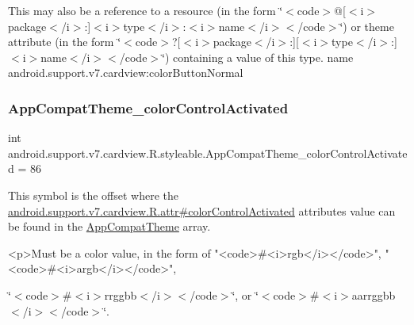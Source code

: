 This may also be a reference to a resource (in the form \char`\"{}$<$code$>$@\mbox{[}$<$i$>$package$<$/i$>$\+:\mbox{]}$<$i$>$type$<$/i$>$\+:$<$i$>$name$<$/i$>$$<$/code$>$\char`\"{}) or theme attribute (in the form \char`\"{}$<$code$>$?\mbox{[}$<$i$>$package$<$/i$>$\+:\mbox{]}\mbox{[}$<$i$>$type$<$/i$>$\+:\mbox{]}$<$i$>$name$<$/i$>$$<$/code$>$\char`\"{}) containing a value of this type.  name android.\+support.\+v7.\+cardview\+:color\+Button\+Normal \mbox{\label{classandroid_1_1support_1_1v7_1_1cardview_1_1R_1_1styleable_acb93386ddcf1e452debdf2acf6cb2f17}} 
\subsubsection{\texorpdfstring{App\+Compat\+Theme\+\_\+color\+Control\+Activated}{AppCompatTheme\_colorControlActivated}}
{\footnotesize\ttfamily int android.\+support.\+v7.\+cardview.\+R.\+styleable.\+App\+Compat\+Theme\+\_\+color\+Control\+Activated = 86\hspace{0.3cm}{\ttfamily [static]}}

This symbol is the offset where the \hyperlink{classandroid_1_1support_1_1v7_1_1cardview_1_1R_1_1attr_a59fd03e0a464d197160b8c11316cc56a}{android.\+support.\+v7.\+cardview.\+R.\+attr\#color\+Control\+Activated} attribute\textquotesingle{}s value can be found in the \hyperlink{classandroid_1_1support_1_1v7_1_1cardview_1_1R_1_1styleable_a52e6f69f954ecc2622d72c0b4d298938}{App\+Compat\+Theme} array.

\begin{DoxyVerb}      <p>Must be a color value, in the form of "<code>#<i>rgb</i></code>", "<code>#<i>argb</i></code>",
\end{DoxyVerb}
 \char`\"{}$<$code$>$\#$<$i$>$rrggbb$<$/i$>$$<$/code$>$\char`\"{}, or \char`\"{}$<$code$>$\#$<$i$>$aarrggbb$<$/i$>$$<$/code$>$\char`\"{}. 

